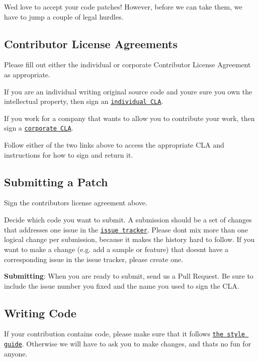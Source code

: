 We\textquotesingle{}d love to accept your code patches! However, before we can take them, we have to jump a couple of legal hurdles.

\subsection*{Contributor License Agreements}

Please fill out either the individual or corporate Contributor License Agreement as appropriate.


\begin{DoxyItemize}
\item If you are an individual writing original source code and you\textquotesingle{}re sure you own the intellectual property, then sign an \href{https://developers.google.com/open-source/cla/individual}{\tt individual C\+LA}.
\item If you work for a company that wants to allow you to contribute your work, then sign a \href{https://developers.google.com/open-source/cla/corporate}{\tt corporate C\+LA}.
\end{DoxyItemize}

Follow either of the two links above to access the appropriate C\+LA and instructions for how to sign and return it.

\subsection*{Submitting a Patch}


\begin{DoxyEnumerate}
\item Sign the contributors license agreement above.
\item Decide which code you want to submit. A submission should be a set of changes that addresses one issue in the \href{https://github.com/google/leveldb/issues}{\tt issue tracker}. Please don\textquotesingle{}t mix more than one logical change per submission, because it makes the history hard to follow. If you want to make a change (e.\+g. add a sample or feature) that doesn\textquotesingle{}t have a corresponding issue in the issue tracker, please create one.
\item {\bfseries Submitting}\+: When you are ready to submit, send us a Pull Request. Be sure to include the issue number you fixed and the name you used to sign the C\+LA.
\end{DoxyEnumerate}

\subsection*{Writing Code}

If your contribution contains code, please make sure that it follows \href{http://google-styleguide.googlecode.com/svn/trunk/cppguide.xml}{\tt the style guide}. Otherwise we will have to ask you to make changes, and that\textquotesingle{}s no fun for anyone. 